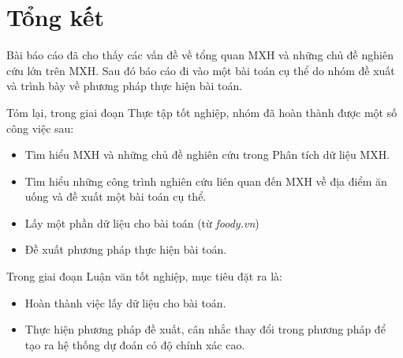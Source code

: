 \documentclass[12pt]{extarticle}
\begin{document}
	\section{Tổng kết}
		\par Bài báo cáo đã cho thấy các vấn đề về tổng quan MXH và những chủ đề nghiên cứu lớn trên MXH. Sau đó báo cáo đi vào một bài toán cụ thể do nhóm đề xuất và trình bày về phương pháp thực hiện bài toán.
		\par Tóm lại, trong giai đoạn Thực tập tốt nghiệp, nhóm đã hoàn thành được một số công việc sau:
		\begin{itemize}
			\item Tìm hiểu MXH và những chủ đề nghiên cứu trong Phân tích dữ liệu MXH.
			\item Tìm hiểu những công trình nghiên cứu liên quan đến MXH về địa điểm ăn uống và đề xuất một bài toán cụ thể. 
			\item Lấy một phần dữ liệu cho bài toán (từ \textit{foody.vn})
			\item Đề xuất phương pháp thực hiện bài toán.
		\end{itemize}

		\par Trong giai đoạn Luận văn tốt nghiệp, mục tiêu đặt ra là:

		\begin{itemize}
			\item Hoàn thành việc lấy dữ liệu cho bài toán.
			\item Thực hiện phương pháp đề xuất, cân nhắc thay đổi trong phương pháp để tạo ra hệ thống dự đoán có độ chính xác cao.
		\end{itemize}
		\newpage
\end{document}
